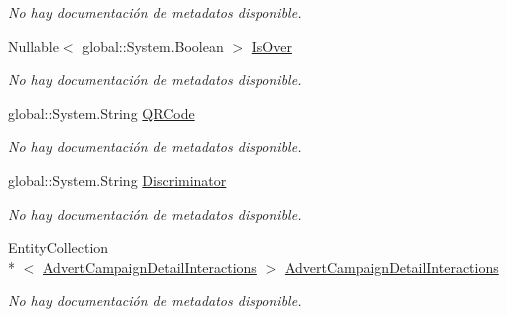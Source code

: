 \begin{DoxyCompactItemize}
\begin{DoxyCompactList}\small\item\em No hay documentación de metadatos disponible. \end{DoxyCompactList}\item 
Nullable$<$ global\-::\-System.\-Boolean $>$ \hyperlink{class_microsoft_1_1_samples_1_1_kinect_1_1_basic_interactions_1_1_adverts_a62dfaadc97b1098e979a88a7240296ac}{Is\-Over}
\begin{DoxyCompactList}\small\item\em No hay documentación de metadatos disponible. \end{DoxyCompactList}\item 
global\-::\-System.\-String \hyperlink{class_microsoft_1_1_samples_1_1_kinect_1_1_basic_interactions_1_1_adverts_a2d91bc840239c541da939e7d0877b8ff}{Q\-R\-Code}
\begin{DoxyCompactList}\small\item\em No hay documentación de metadatos disponible. \end{DoxyCompactList}\item 
global\-::\-System.\-String \hyperlink{class_microsoft_1_1_samples_1_1_kinect_1_1_basic_interactions_1_1_adverts_aec0aa27a75663ac767fead18525288cd}{Discriminator}
\begin{DoxyCompactList}\small\item\em No hay documentación de metadatos disponible. \end{DoxyCompactList}\item 
Entity\-Collection\\*
$<$ \hyperlink{class_microsoft_1_1_samples_1_1_kinect_1_1_basic_interactions_1_1_advert_campaign_detail_interactions}{Advert\-Campaign\-Detail\-Interactions} $>$ \hyperlink{class_microsoft_1_1_samples_1_1_kinect_1_1_basic_interactions_1_1_adverts_af2045376c36b8501f380bb16f798110f}{Advert\-Campaign\-Detail\-Interactions}
\begin{DoxyCompactList}\small\item\em No hay documentación de metadatos disponible. \end{DoxyCompactList}\item 

\end{DoxyCompactItemize}
